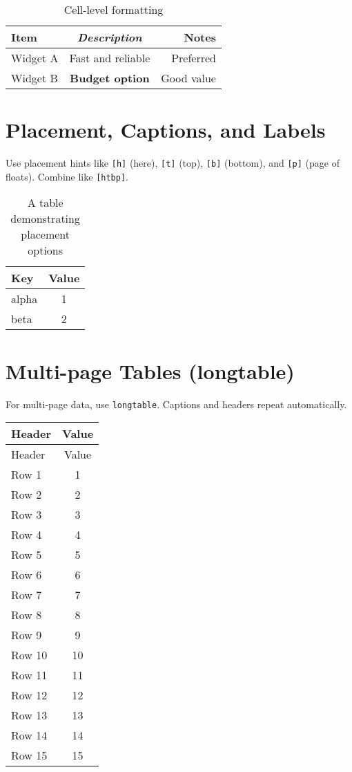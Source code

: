 \documentclass{article}
\begin{document}
\begin{table}[htbp]
\centering
\begin{tabular}{lcr}
\toprule
\textbf{\sffamily Item} & {\itshape Description} & {\small Notes} \\
\midrule
Widget A & Fast and reliable & Preferred \\
Widget B & \bfseries Budget option & Good value \\
\bottomrule
\end{tabular}
\caption{Cell-level formatting}
\label{tab:cell-formatting}
\end{table}

\clearpage
\section{Placement, Captions, and Labels}
Use placement hints like \verb|[h]| (here), \verb|[t]| (top), \verb|[b]| (bottom), and \verb|[p]| (page of floats). Combine like \verb|[htbp]|.

\begin{table}[htbp]
\centering
\begin{tabular}{lc}
\toprule
Key & Value \\
\midrule
alpha & 1 \\
beta & 2 \\
\bottomrule
\end{tabular}
\caption{A table demonstrating placement options}
\label{tab:placement}
\end{table}

\clearpage
\section{Multi-page Tables (longtable)}
For multi-page data, use \texttt{longtable}. Captions and headers repeat automatically.

\begin{center}
\begin{longtable}{|l|c|}
\hline
Header & Value \\
\hline
\endfirsthead
\hline
Header & Value \\
\hline
\endhead
\hline
\endfoot
\hline
\endlastfoot
Row 1 & 1 \\
Row 2 & 2 \\
Row 3 & 3 \\
Row 4 & 4 \\
Row 5 & 5 \\
Row 6 & 6 \\
Row 7 & 7 \\
Row 8 & 8 \\
Row 9 & 9 \\
Row 10 & 10 \\
Row 11 & 11 \\
Row 12 & 12 \\
Row 13 & 13 \\
Row 14 & 14 \\
Row 15 & 15 \\
\end{longtable}
\end{center}
\end{document}
